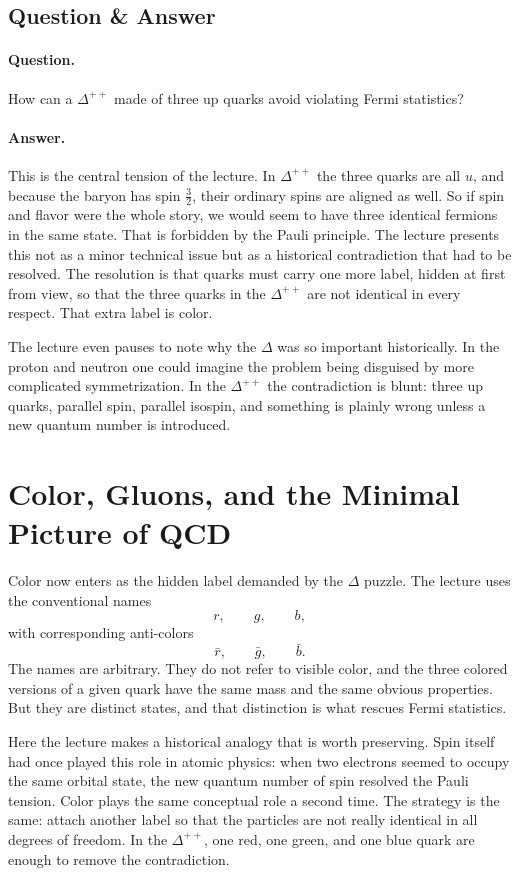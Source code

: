 \subsection{Question \& Answer}

\paragraph{Question.} How can a \(\Delta^{++}\) made of three up quarks avoid violating Fermi statistics?

\paragraph{Answer.} This is the central tension of the lecture. In \(\Delta^{++}\) the three quarks are all \(u\), and because the baryon has spin \(\tfrac32\), their ordinary spins are aligned as well. So if spin and flavor were the whole story, we would seem to have three identical fermions in the same state. That is forbidden by the Pauli principle. The lecture presents this not as a minor technical issue but as a historical contradiction that had to be resolved. The resolution is that quarks must carry one more label, hidden at first from view, so that the three quarks in the \(\Delta^{++}\) are not identical in every respect. That extra label is color.

The lecture even pauses to note why the \(\Delta\) was so important historically. In the proton and neutron one could imagine the problem being disguised by more complicated symmetrization. In the \(\Delta^{++}\) the contradiction is blunt: three up quarks, parallel spin, parallel isospin, and something is plainly wrong unless a new quantum number is introduced.

\section{Color, Gluons, and the Minimal Picture of QCD}

Color now enters as the hidden label demanded by the \(\Delta\) puzzle. The lecture uses the conventional names
\[
r,\qquad g,\qquad b,
\]
with corresponding anti-colors
\[
\bar r,\qquad \bar g,\qquad \bar b.
\]
The names are arbitrary. They do not refer to visible color, and the three colored versions of a given quark have the same mass and the same obvious properties. But they are distinct states, and that distinction is what rescues Fermi statistics.

Here the lecture makes a historical analogy that is worth preserving. Spin itself had once played this role in atomic physics: when two electrons seemed to occupy the same orbital state, the new quantum number of spin resolved the Pauli tension. Color plays the same conceptual role a second time. The strategy is the same: attach another label so that the particles are not really identical in all degrees of freedom. In the \(\Delta^{++}\), one red, one green, and one blue quark are enough to remove the contradiction.

